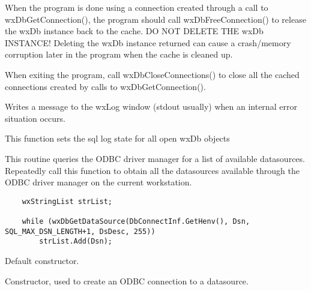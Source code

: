 When the program is done using a connection created through a call to
wxDbGetConnection(), the program should call wxDbFreeConnection() to release
the wxDb instance back to the cache.  DO NOT DELETE THE wxDb INSTANCE!
Deleting the wxDb instance returned can cause a crash/memory corruption
later in the program when the cache is cleaned up.

When exiting the program, call wxDbCloseConnections() to close all the
cached connections created by calls to wxDbGetConnection().



Writes a message to the wxLog window (stdout usually) when an internal
error situation occurs.



This function sets the sql log state for all open wxDb objects



This routine queries the ODBC driver manager for a list of available
datasources.  Repeatedly call this function to obtain all the datasources
available through the ODBC driver manager on the current workstation.

\begin{verbatim}
    wxStringList strList;

    while (wxDbGetDataSource(DbConnectInf.GetHenv(), Dsn, SQL_MAX_DSN_LENGTH+1, DsDesc, 255))
        strList.Add(Dsn);
\end{verbatim}


\label{wxdbctor}


Default constructor.


Constructor, used to create an ODBC connection to a datasource.

